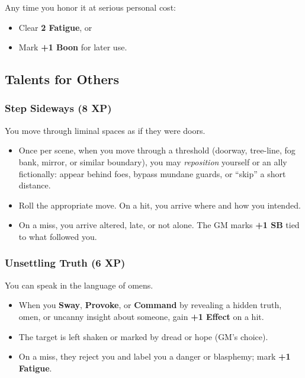 \documentclass[11pt]{book}
\begin{document}
Any time you honor it at serious personal cost:
\begin{itemize}
  \item Clear \textbf{2 Fatigue}, or
  \item Mark \textbf{+1 Boon} for later use.
\end{itemize}

\subsection{Talents for Others}
\label{subsec:others_talents}

\subsubsection{Step Sideways (8 XP)}
\label{talent:step_sideways}

You move through liminal spaces as if they were doors.

\begin{itemize}
  \item Once per scene, when you move through a threshold (doorway, tree-line, fog bank, mirror, or similar boundary), you may \emph{reposition} yourself or an ally fictionally: appear behind foes, bypass mundane guards, or ``skip'' a short distance.
  \item Roll the appropriate move. On a hit, you arrive where and how you intended.
  \item On a miss, you arrive altered, late, or not alone. The GM marks \textbf{+1 SB} tied to what followed you.
\end{itemize}

\subsubsection{Unsettling Truth (6 XP)}
\label{talent:unsettling_truth}

You can speak in the language of omens.

\begin{itemize}
  \item When you \textbf{Sway}, \textbf{Provoke}, or \textbf{Command} by revealing a hidden truth, omen, or uncanny insight about someone, gain \textbf{+1 Effect} on a hit.
  \item The target is left shaken or marked by dread or hope (GM's choice).
  \item On a miss, they reject you and label you a danger or blasphemy; mark \textbf{+1 Fatigue}.
\end{itemize}
\end{document}
